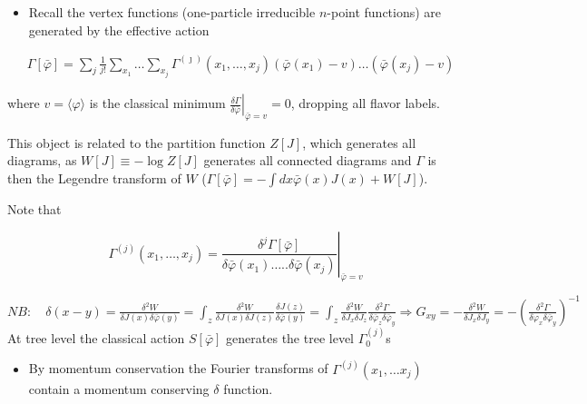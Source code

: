 \begin{itemize}
  \item Recall the vertex functions (one-particle irreducible $n$-point functions) are generated by the effective action
\end{itemize}

\begin{equation}
\begin{aligned}
& \Gamma[\bar{\varphi}]=\sum_{j} \frac{1}{j!} \sum_{x_{1}} \ldots \sum_{x_j} \Gamma^{(\jmath)}\left(x_{1} ,\ldots, x_{j}\right)\left(\bar{\varphi}\left(x_{1}\right)-v\right) \ldots\left(\bar{\varphi}\left(x_{j}\right)-v\right)
\end{aligned}
\end{equation}

where \(v=\langle\varphi\rangle\) is the classical minimum \(\left.\frac{\delta \Gamma}{\delta \bar{\varphi}}\right|_{\bar{\varphi}=v}=0\), dropping all flavor labels.

This object is related to the partition function $Z[J]$, which generates all diagrams, as $W[J]\equiv-\log Z[J]$ generates all connected diagrams and $\Gamma$ is then the Legendre transform of $W$ ($\Gamma[\bar\varphi]=-\int dx \bar\varphi(x)J(x)+W[J]$).

Note that

\begin{equation}
\Gamma^{(j)}\left(x_{1}, \ldots, x_{j}\right)=\left.\frac{\delta^{j} \Gamma[\bar{\varphi}]}{\delta \bar{\varphi}\left(x_{1}\right) \ldots . . \delta \bar{\varphi}\left(x_{j}\right)}\right|_{\bar\varphi=v}
\end{equation}

\(N B: \quad \delta(x-y)=\frac{\delta^{2} W}{\delta J(x) \delta \bar{\varphi}(y)}=\int_{z} \frac{\delta^{2} W}{\delta J(x) \delta J(z)} \frac{\delta J(z)}{\delta \bar{\varphi}(y)}=\int_{z} \frac{\delta^{2} W}{\delta J_{x} \delta J_{z}} \frac{\delta^{2} \Gamma}{\delta \bar{\varphi}_{z} \delta \bar{\varphi}_{y}} \Rightarrow G_{x y}=-\frac{\delta^{2} W}{\delta J_x \delta J_y}=-\left(\frac{\delta^{2} \Gamma}{\delta \varphi_x \delta \bar{\varphi}_y}\right)^{-1}\)\\
At tree level the classical action \(S[\bar{\varphi}]\) generates the tree level \(\Gamma_{0}^{(j)}\)s

\begin{itemize}
  \item By momentum conservation the Fourier transforms of \(\Gamma^{(j)}\left(x_{1}, \ldots x_{j}\right)\) contain a momentum conserving \(\delta\) function.
\end{itemize}

